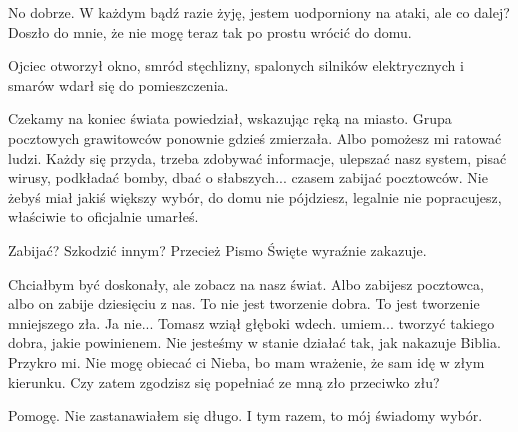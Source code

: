 \ds{} No dobrze. W każdym bądź razie żyję, jestem uodporniony na ataki, ale co dalej? \dm{} Doszło do mnie, że nie mogę teraz tak po prostu wrócić do domu.\de{}

Ojciec otworzył okno, smród stęchlizny, spalonych silników elektrycznych i smarów wdarł się do pomieszczenia.

\ds{} Czekamy na koniec świata \dm{} powiedział, wskazując ręką na miasto. Grupa pocztowych grawitowców ponownie gdzieś zmierzała. \dm{}
Albo pomożesz mi ratować ludzi. Każdy się przyda, trzeba zdobywać informacje, ulepszać nasz system, pisać wirusy, podkładać bomby, dbać o słabszych... czasem zabijać pocztowców. 
Nie żebyś miał jakiś większy wybór, do domu nie pójdziesz, legalnie nie popracujesz, właściwie to oficjalnie umarłeś. \de{}

\ds{} Zabijać? Szkodzić innym? Przecież Pismo Święte wyraźnie zakazuje. \de{}

\ds{} Chciałbym być doskonały, ale zobacz na nasz świat.
Albo zabijesz pocztowca, albo on zabije dziesięciu z nas. 
To nie jest tworzenie dobra. To jest tworzenie mniejszego zła.
Ja nie... \dm{} Tomasz wziął głęboki wdech. \dm{} umiem... tworzyć takiego dobra, jakie powinienem.
Nie jesteśmy w stanie działać tak, jak nakazuje Biblia. Przykro mi.
Nie mogę obiecać ci Nieba, bo mam wrażenie, że sam idę w złym kierunku. Czy zatem zgodzisz się popełniać ze mną zło przeciwko złu? 

\ds{} Pomogę. \dm{} Nie zastanawiałem się długo. \dm{} I tym razem, to mój świadomy wybór. \de{}













